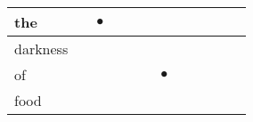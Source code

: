 \documentclass[landscape]{article}
\newcommand{\ssp}{\hspace{2pt}}
\newcommand{\mex}{\cellcolor{g}$\bullet$}
\begin{document}
\begin{tabular}{|l|p{10pt}|p{10pt}|p{10pt}|p{10pt}|p{10pt}|p{10pt}|p{10pt}|p{10pt}|p{10pt}|p{10pt}|p{10pt}|}
\hline
\ssp \cellcolor{ref1}the \ssp&\hspace{2pt}&\hspace{2pt}\mex&\hspace{2pt}&\hspace{2pt}&\hspace{2pt}&\hspace{2pt}&\hspace{2pt}&\hspace{2pt}&\hspace{2pt}&\hspace{2pt}&\hspace{2pt}\\
\hline
\ssp darkness \ssp&\hspace{2pt}&\hspace{2pt}&\hspace{2pt}&\hspace{2pt}&\hspace{2pt}&\hspace{2pt}&\hspace{2pt}&\hspace{2pt}&\hspace{2pt}&\hspace{2pt}&\hspace{2pt}\\
\hline
\ssp \cellcolor{ref5}of \ssp&\hspace{2pt}&\hspace{2pt}&\hspace{2pt}&\hspace{2pt}&\hspace{2pt}&\hspace{2pt}\mex&\hspace{2pt}&\hspace{2pt}&\hspace{2pt}&\hspace{2pt}&\hspace{2pt}\\
\hline
\ssp food \ssp&\hspace{2pt}&\hspace{2pt}&\hspace{2pt}&\hspace{2pt}&\hspace{2pt}&\hspace{2pt}&\hspace{2pt}&\hspace{2pt}&\hspace{2pt}&\hspace{2pt}&\hspace{2pt}\\

\end{tabular}
\end{document}
